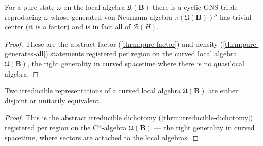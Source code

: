 \begin{theorem}
    \label{thrm:pure-factor-generates-in-curved-spacetime}
    \leanok
    For a pure state $\omega$ on the local algebra $\mathfrak{U}(\mathbf{B})$ there is a cyclic GNS triple reproducing $\omega$ whose generated von Neumann algebra $\pi(\mathfrak{U}(\mathbf{B}))''$ has trivial center (it is a factor) and is in fact all of $\mathcal{B}(H)$.
\end{theorem}
\begin{proof}
    \leanok
    These are the abstract factor (\ref{thrm:pure-factor}) and density (\ref{thrm:pure-generates-all}) statements registered per region on the curved local algebra $\mathfrak{U}(\mathbf{B})$, the right generality in curved spacetime where there is no quasilocal algebra.
\end{proof}

\begin{theorem}
    \label{thrm:irreducible-dichotomy-in-curved-spacetime}
    \leanok
    Two irreducible representations of a curved local algebra $\mathfrak{U}(\mathbf{B})$ are either disjoint or unitarily equivalent.
\end{theorem}
\begin{proof}
    \leanok
    This is the abstract irreducible dichotomy (\ref{thrm:irreducible-dichotomy}) registered per region on the C*-algebra $\mathfrak{U}(\mathbf{B})$ --- the right generality in curved spacetime, where sectors are attached to the local algebras.
\end{proof}

